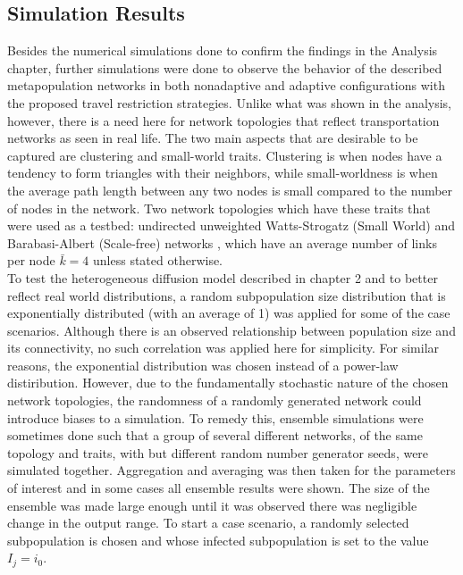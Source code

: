 \clearpage
\subsection{Simulation Results}

Besides the numerical simulations done to confirm the findings in the Analysis chapter, further simulations were done to observe the behavior of the described metapopulation networks in both nonadaptive and adaptive configurations with the proposed travel restriction strategies. Unlike what was shown in the analysis, however, there is a need here for network topologies that reflect transportation networks as seen in real life. The two main aspects that are desirable to be captured are clustering and small-world traits. Clustering is when nodes have a tendency to form triangles with their neighbors, while small-worldness is when the average path length between any two nodes is small compared to the number of nodes in the network. Two network topologies which have these traits that were used as a testbed: undirected unweighted Watts-Strogatz (Small World) and Barabasi-Albert (Scale-free) networks %
, which have an average number of links per node $\bar k=4$ unless stated otherwise.\\

To test the heterogeneous diffusion model described in chapter 2 and to better reflect real world distributions, a random subpopulation size distribution that is exponentially distributed (with an average of 1) was applied for some of the case scenarios. Although there is an observed relationship between population size and its connectivity, no such correlation was applied here for simplicity. For similar reasons, the exponential distribution was chosen instead of a power-law distiribution. %
However, due to the fundamentally stochastic nature of the chosen network topologies, the randomness of a randomly generated network could introduce biases to a simulation. To remedy this, ensemble simulations were sometimes done such that a group of several different networks, of the same topology and traits, with but different random number generator seeds, were simulated together. Aggregation and averaging was then taken for the parameters of interest and in some cases all ensemble results were shown. The size of the ensemble was made large enough until it was observed there was negligible change in the output range. To start a case scenario, a randomly selected subpopulation is chosen and whose infected subpopulation is set to the value $I_j=i_0$.\\ 

